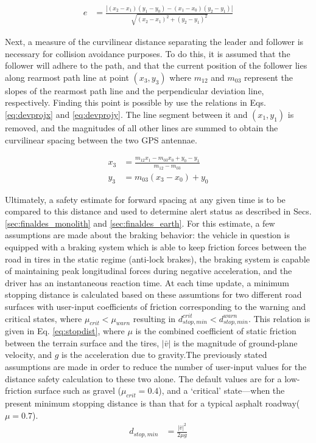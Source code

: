 \documentclass[12pt]{report}
\begin{document}
\begin{align} \label{eq:laterr}
    e &= \frac{ | (x_2 - x_1)(y_1 - y_0) - (x_1 - x_0)(y_2 - y_1) | } { \sqrt{ (x_2 - x_1)^2 + (y_2 - y_1)^2 } }
\end{align}

Next, a measure of the curvilinear distance separating the leader and follower is necessary for collision avoidance purposes. To do this, it is assumed that the follower will adhere to the path, and that the current position of the follower lies along rearmost path line at point $(x_3, y_3)$ where $m_{12}$ and $m_{03}$ represent the slopes of the rearmost path line and the perpendicular deviation line, respectively. Finding this point is possible by use the relations in Eqs. \ref{eq:devprojx} and \ref{eq:devprojy}. The line segment between it and $(x_1,y_1)$ is removed, and the magnitudes of all other lines are summed to obtain the curvilinear spacing between the two GPS antennae. 

\begin{align} 
    x_3 &= \frac{ m_{12} x_1 - m_{03} x_0 + y_0 - y_1 } { m_{12} - m_{03} } \label{eq:devprojx} \\
    y_3 &= m_{03} (x_3 - x_0) + y_0 \label{eq:devprojy}
\end{align}

Ultimately, a safety estimate for forward spacing at any given time is to be compared to this distance and used to determine alert status as described in Secs. \ref{sec:finaldes_monolith} and \ref{sec:finaldes_earth}. For this estimate, a few assumptions are made about the braking behavior: the vehicle in question is equipped with a braking system which is able to keep friction forces between the road in tires in the static regime (anti-lock brakes), the braking system is capable of maintaining peak longitudinal forces during negative acceleration, and the driver has an instantaneous reaction time. At each time update, a minimum stopping distance is calculated based on these assumtions for two different road surfaces with user-input coefficients of friction corresponding to the warning and critical states, where $\mu_{crit}<\mu_{warn}$ resulting in $d_{stop, min}^{crit} < d_{stop, min}^{warn}$. This relation is given in Eq. \ref{eq:stopdist}, where $\mu$  is the combined coefficient of static friction between the terrain surface and the tires,  $|\bar{v}|$ is the magnitude of ground-plane velocity, and $g$ is the acceleration due to gravity.The previously stated assumptions are made in order to reduce the number of user-input values for the distance safety calculation to these two alone. The default values are for a low-friction surface such as gravel ($\mu_{crit}=0.4$), and a `critical' state---when the present minimum stopping distance is than that for a typical asphalt roadway($\mu=0.7$). 
\begin{align} \label{eq:stopdist}
    d_{stop, min} &= \frac {|\bar{v}|^2} {2 \mu g}
\end{align}
\end{document}
